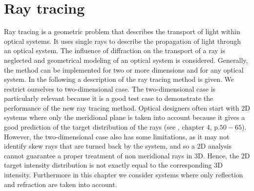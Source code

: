 \chapter{Ray tracing}\label{chap:raytracing}
Ray tracing is a geometric problem that describes the transport of light within optical systems.
It uses single rays to describe the propagation of light through an optical system.
The influence of diffraction on the transport of a ray is neglected and geometrical modeling of an optical system is considered.
Generally, the method can be implemented for two or more dimensions and for any optical system.
In the following a description of the ray tracing method is given. We restrict ourselves to two-dimensional case.
The two-dimensional case is particularly relevant because it is a good test case to demonstrate the performance of the new ray tracing method.
Optical designers often start with 2D systems where only the meridional plane is taken into account because it gives a good prediction of the target distribution of the rays
(see \cite{winston2005nonimaging}, chapter $4$, p.$50-65$). However, the two-dimensional case also has some limitations, as it may not identify skew rays that are turned back by the system, and so a 2D analysis cannot guarantee a proper treatment of non meridional rays in 3D. Hence, the 2D target intensity distribution is not exactly equal to the corresponding 3D intensity. Furthermore in this chapter we consider systems where only reflection and refraction are taken into account.
